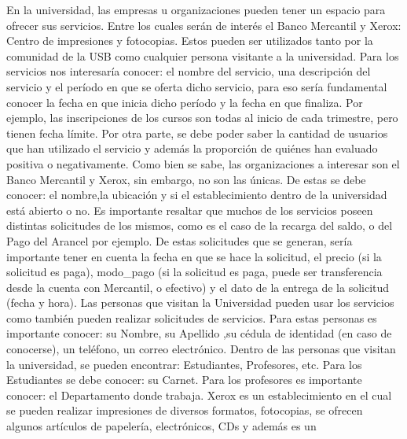 \documentclass[12pt,a4paper,spanish]{article}
\begin{document}
\indent En la universidad, las empresas u organizaciones pueden tener un espacio para
ofrecer sus servicios. Entre los cuales ser\'an de inter\'es el
Banco Mercantil y Xerox: Centro de impresiones y fotocopias. Estos
pueden ser utilizados tanto por la comunidad de la USB como cualquier
persona visitante a la universidad. Para los servicios nos interesar\'ia conocer: el nombre del
servicio, una descripci\'on del servicio y el per\'iodo en que se
oferta dicho servicio, para eso ser\'ia fundamental conocer la fecha
en que inicia dicho per\'iodo y la fecha en que finaliza. Por ejemplo, las inscripciones de los cursos son todas al inicio de cada trimestre, pero tienen fecha l\'imite. 
Por otra parte, se debe poder saber la cantidad de usuarios que han utilizado el servicio y adem\'as la proporci\'on de qui\'enes
han evaluado positiva o negativamente.
\newline 
\indent Como bien se sabe, las organizaciones a interesar son el Banco Mercantil y Xerox, sin embargo, no son las \'unicas. De estas se debe conocer: el nombre,la ubicaci\'on y si 
el establecimiento dentro de la universidad est\'a abierto o no.
\newline
\newline
\indent Es importante resaltar que muchos de los servicios poseen
distintas solicitudes de los mismos, como es el caso de la recarga del
saldo, o del Pago del Arancel por ejemplo. De estas solicitudes que se
generan, ser\'ia importante tener en cuenta la fecha en que se hace la
solicitud, el precio (si la solicitud es paga), modo\_pago (si la
solicitud es paga, puede ser transferencia desde la cuenta con
Mercantil, o efectivo) y el dato de la entrega de la solicitud (fecha y hora).
\newline
\newline
\indent Las personas que visitan la Universidad pueden usar los
servicios como tambi\'en pueden realizar solicitudes de
servicios. Para estas personas es importante conocer: su Nombre, su
Apellido ,su c\'edula de identidad (en caso de conocerse), un
tel\'efono, un correo electr\'onico. Dentro de las personas que visitan la
universidad, se pueden encontrar: Estudiantes, Profesores, etc. Para
los Estudiantes se debe conocer: su Carnet. Para los
profesores es importante conocer: el Departamento donde
trabaja. 
\newline
\newline
\indent Xerox es un establecimiento en el cual se pueden realizar
impresiones de diversos formatos, fotocopias, se ofrecen algunos
art\'iculos de papeler\'ia, electr\'onicos, CDs y adem\'as es un
\end{document}
